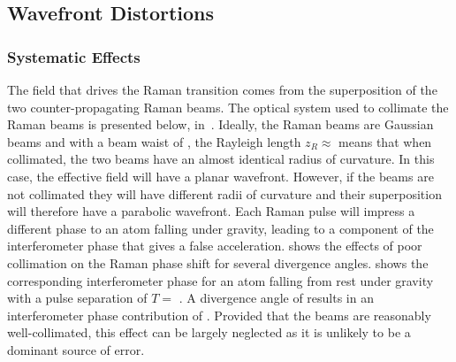 \subsection{Wavefront Distortions}\label{subsec:fringe_wavefront}
\subsubsection{Systematic Effects}
The field that drives the Raman transition comes from the
superposition of the two counter-propagating Raman beams. The optical
system used to collimate the Raman beams is presented below,
in~. Ideally,
the Raman beams are Gaussian beams and with a beam
waist of , the Rayleigh length $z_R \approx
$  means that when collimated, the two beams have an
almost identical radius of curvature. In this case, the effective field will have a planar wavefront.
However, if the beams are not collimated they will have different
radii of curvature and their superposition will therefore
have a parabolic wavefront. Each Raman pulse will impress a different
phase to an atom falling under gravity, leading to a component of the
interferometer phase that gives a false acceleration. 
 shows the effects of poor
collimation on the Raman phase shift for several divergence
angles.  shows the corresponding interferometer phase for an
atom falling from rest under gravity with a pulse separation of $T=$
. A divergence angle of
 results in an interferometer phase
contribution of .  
Provided that the beams are reasonably
well-collimated, this effect can be largely neglected as it is
unlikely to be a dominant source of error. 
